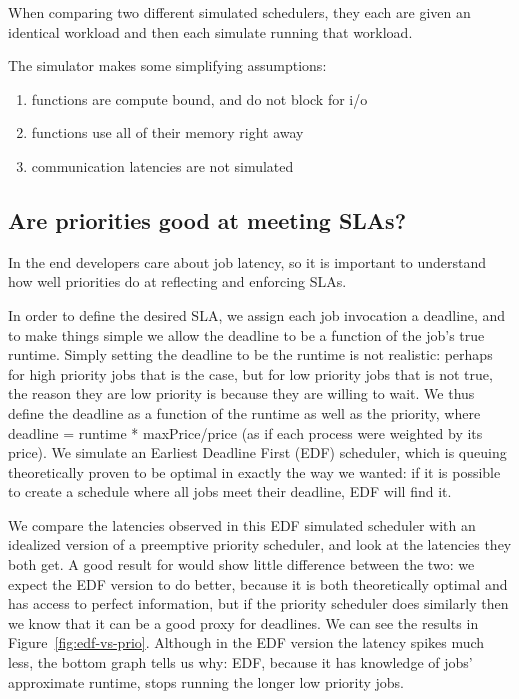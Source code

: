 When comparing two different simulated schedulers, they each are given an
identical workload and then each simulate running that workload.

The simulator makes some simplifying assumptions:
\begin{enumerate}
    \item functions are compute bound, and do not block for i/o
    \item functions use all of their memory right away
    \item communication latencies are not simulated
\end{enumerate}

\subsection{Are priorities good at meeting SLAs?}

In the end developers care about job latency, so it is important to understand
how well priorities do at reflecting and enforcing SLAs.

In order to define the desired SLA, we assign each job invocation a deadline,
and to make things simple we allow the deadline to be a function of the job's
true runtime. Simply setting the deadline to be the runtime is not realistic:
perhaps for high priority jobs that is the case, but for low priority jobs that
is not true, the reason they are low priority is because they are willing to
wait. We thus define the deadline as a function of the runtime as well as the
priority, where deadline = runtime * maxPrice/price (as if each process were
weighted by its price). We simulate an Earliest Deadline First (EDF) scheduler,
which is queuing theoretically proven to be optimal in exactly the way we
wanted: if it is possible to create a schedule where all jobs meet their
deadline, EDF will find it\cite{TODO}.

We compare the latencies observed in this EDF simulated scheduler with an
idealized version of a preemptive priority scheduler, and look at the latencies
they both get. A good result for \sys{} would show little difference between the
two: we expect the EDF version to do better, because it is both theoretically
optimal and has access to perfect information, but if the priority scheduler
does similarly then we know that it can be a good proxy for deadlines. We can
see the results in Figure~\ref{fig:edf-vs-prio}. Although in the EDF version the
latency spikes much less, the bottom graph tells us why: EDF, because it has
knowledge of jobs' approximate runtime, stops running the longer low priority
jobs.

